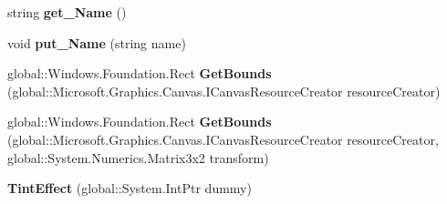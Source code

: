 \begin{DoxyCompactItemize}
string {\bfseries get\+\_\+\+Name} ()
\item 
\mbox{\label{class_microsoft_1_1_graphics_1_1_canvas_1_1_effects_1_1_tint_effect_ac9913b2c3c2046f8e042f4f36c70fb5c}} 
void {\bfseries put\+\_\+\+Name} (string name)
\item 
\mbox{\label{class_microsoft_1_1_graphics_1_1_canvas_1_1_effects_1_1_tint_effect_afab469584252d81d12499e6f9b9a6e10}} 
global\+::\+Windows.\+Foundation.\+Rect {\bfseries Get\+Bounds} (global\+::\+Microsoft.\+Graphics.\+Canvas.\+I\+Canvas\+Resource\+Creator resource\+Creator)
\item 
\mbox{\label{class_microsoft_1_1_graphics_1_1_canvas_1_1_effects_1_1_tint_effect_a874cd7c0fda492b02303c38329523bb5}} 
global\+::\+Windows.\+Foundation.\+Rect {\bfseries Get\+Bounds} (global\+::\+Microsoft.\+Graphics.\+Canvas.\+I\+Canvas\+Resource\+Creator resource\+Creator, global\+::\+System.\+Numerics.\+Matrix3x2 transform)
\item 
\mbox{\label{class_microsoft_1_1_graphics_1_1_canvas_1_1_effects_1_1_tint_effect_ab6a7900d7383e34db9dae72dfca0b03c}} 
{\bfseries Tint\+Effect} (global\+::\+System.\+Int\+Ptr dummy)
\end{DoxyCompactItemize}

